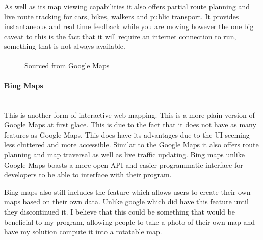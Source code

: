 \begin{flushleft}
            As well as its map viewing capabilities it also offers partial route planning and live route tracking for cars, bikes, walkers and public transport. It provides instantaneous and
            real time feedback while you are moving however the one big caveat to this is the fact that it will require an internet connection to run, something that is not always available. \\
            \bk
            
            \begin{figure}[H]
                \centering
                \caption*{Sourced from Google Maps\textsuperscript{\tiny\textcopyright}}
            \end{figure}

            \bk 
            
            \paragraph{Bing Maps} \mbox{} \\
            This is another form of interactive web mapping. This is a more plain version of Google Maps at first glace. This is due to the fact that it does not have as many features as Google Maps.
            This does have its advantages due to the UI seeming less cluttered and more accessible. Similar to the Google Maps it also offers route planning and map traversal as well as live traffic updating.
            Bing maps unlike Google Maps boasts a more open API and easier programmatic interface for developers to be able to interface with their program. \\
 
            \bk
 
            Bing maps also still includes the feature which allows users to create their own maps based on their own data. Unlike google which did have this feature until they discontinued it.
            I believe that this could be something that would be beneficial to my program, allowing people to take a photo of their own map and have my solution compute it into a rotatable map. \\
 

\end{flushleft}
